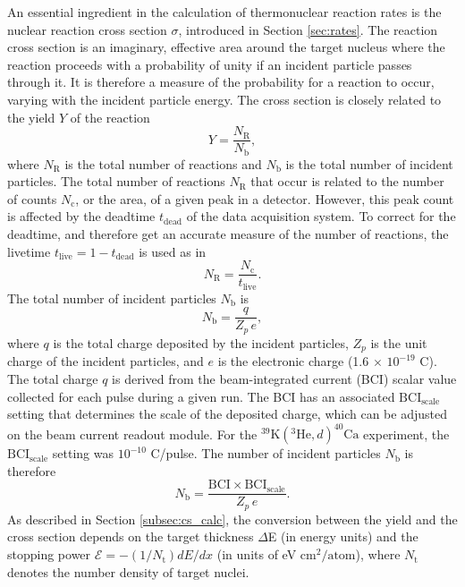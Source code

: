 An essential ingredient in the calculation of thermonuclear reaction rates is the nuclear reaction cross section $\sigma$, introduced in Section \ref{sec:rates}. The reaction cross section is an imaginary, effective area around the target nucleus where the reaction proceeds with a probability of unity if an incident particle passes through it. It is therefore a measure of the probability for a reaction to occur, varying with the incident particle energy. The cross section is closely related to the yield $Y$ of the reaction
\begin{equation}
Y = \frac{N_{\mathrm{R}}}{N_{\mathrm{b}}},
\end{equation}
where $N_{\mathrm{R}}$ is the total number of reactions and $N_{\mathrm{b}}$ is the total number of incident particles. The total number of reactions $N_{\mathrm{R}}$ that occur is related to the number of counts $N_{\mathrm{c}}$, or the area, of a given peak in a detector. However, this peak count is affected by the deadtime $t_{\mathrm{dead}}$ of the data acquisition system. To correct for the deadtime, and therefore get an accurate measure of the number of reactions, the livetime $t_{\mathrm{live}} = 1 - t_{\mathrm{dead}}$ is used as in
\begin{equation}
N_{\mathrm{R}} = \frac{N_{\mathrm{c}}}{t_{\mathrm{live}}}.
\end{equation}
The total number of incident particles $N_{\mathrm{b}}$ is
\begin{equation}
N_{\mathrm{b}} = \frac{q}{Z_{p} \, e},
\end{equation}
where $q$ is the total charge deposited by the incident particles, $Z_{p}$ is the unit charge of the incident particles, and $e$ is the electronic charge (1.6 $\times$ $10^{-19}$ C). The total charge $q$ is derived from the beam-integrated current (BCI) scalar value collected for each pulse during a given run. The BCI has an associated $\mathrm{BCI}_{\mathrm{scale}}$ setting that determines the scale of the deposited charge, which can be adjusted on the beam current readout module. For the $^{39}\mathrm{K}(^{3}\mathrm{He},d)^{40}\mathrm{Ca}$ experiment, the $\mathrm{BCI}_{\mathrm{scale}}$ setting was $10^{-10}$ C/pulse. The number of incident particles $N_{\mathrm{b}}$ is therefore
\begin{equation}
N_{\mathrm{b}} = \frac{\mathrm{BCI} \times \mathrm{BCI_{\mathrm{scale}}}}{Z_{p} \, e}.
\end{equation}
As described in Section \ref{subsec:cs_calc}, the conversion between the yield and the cross section depends on the target thickness $\Delta$E (in energy units) and the stopping power $\mathcal{E} = -(1/N_{\mathrm{t}})dE/dx$ (in units of eV $\mathrm{cm}^{2} / \mathrm{atom}$), where $N_{\mathrm{t}}$ denotes the number density of target nuclei.

